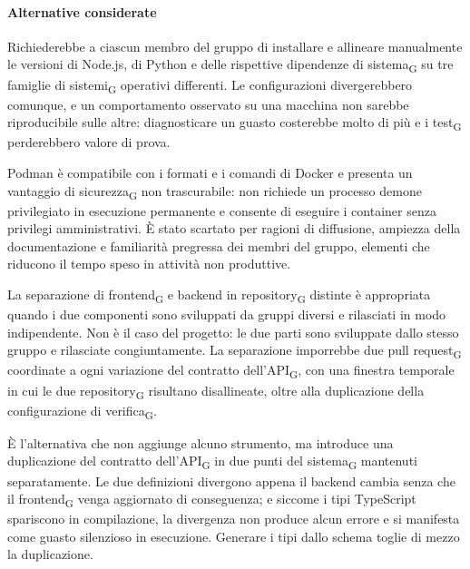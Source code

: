 \documentclass[a4paper, 10pt]{article}
\newenvironment{alternative}{%
  \begin{description}[
    style=nextline,
    leftmargin=0pt,
    labelindent=0pt,
    labelsep=0pt,
    font=\normalfont\bfseries,
    topsep=0.6em,
    itemsep=0.9em,
    parsep=0pt
  ]%
}{%
  \end{description}%
}
\newcommand{\altitem}[1]{\item[\textbullet\enspace #1]}
\begin{document}
\paragraph{Alternative considerate}\mbox{}

\begin{alternative}

\altitem{Configurazione manuale dell'ambiente al posto di Docker}
Richiederebbe a ciascun membro del gruppo di installare e allineare manualmente le versioni di Node.js, di Python e delle rispettive dipendenze di sistema\textsubscript{G} su tre famiglie di sistemi\textsubscript{G} operativi differenti. Le configurazioni divergerebbero comunque, e un comportamento osservato su una macchina non sarebbe riproducibile sulle altre: diagnosticare un guasto costerebbe molto di più e i test\textsubscript{G} perderebbero valore di prova.

\altitem{Podman al posto di Docker}
Podman è compatibile con i formati e i comandi di Docker e presenta un vantaggio di sicurezza\textsubscript{G} non trascurabile: non richiede un processo demone privilegiato in esecuzione permanente e consente di eseguire i container senza privilegi amministrativi. È stato scartato per ragioni di diffusione, ampiezza della documentazione e familiarità pregressa dei membri del gruppo, elementi che riducono il tempo speso in attività non produttive.

\altitem{Poly-repo al posto del mono-repo}
La separazione di frontend\textsubscript{G} e backend in repository\textsubscript{G} distinte è appropriata quando i due componenti sono sviluppati da gruppi diversi e rilasciati in modo indipendente. Non è il caso del progetto: le due parti sono sviluppate dallo stesso gruppo e rilasciate congiuntamente. La separazione imporrebbe due pull request\textsubscript{G} coordinate a ogni variazione del contratto dell'API\textsubscript{G}, con una finestra temporale in cui le due repository\textsubscript{G} risultano disallineate, oltre alla duplicazione della configurazione di verifica\textsubscript{G}.

\altitem{Tipi TypeScript scritti a mano al posto della generazione da OpenAPI}
È l'alternativa che non aggiunge alcuno strumento, ma introduce una duplicazione del contratto dell'API\textsubscript{G} in due punti del sistema\textsubscript{G} mantenuti separatamente. Le due definizioni divergono appena il backend cambia senza che il frontend\textsubscript{G} venga aggiornato di conseguenza; e siccome i tipi TypeScript spariscono in compilazione, la divergenza non produce alcun errore e si manifesta come guasto silenzioso in esecuzione. Generare i tipi dallo schema toglie di mezzo la duplicazione.

\end{alternative}
\end{document}
